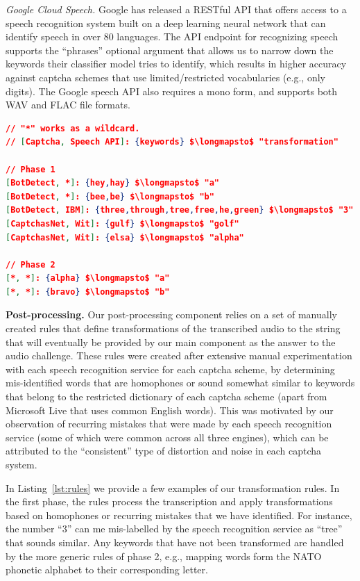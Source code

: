 \emph{Google Cloud Speech.}  Google has released a RESTful API that offers access to a speech recognition system built on 
a deep learning neural network that can identify speech in over 80 languages. The API endpoint for recognizing speech supports
the ``phrases'' optional argument that allows us to narrow down the keywords their classifier model tries to identify, which 
results in higher accuracy against captcha schemes that use limited/restricted vocabularies (e.g., only digits). The Google
speech API also requires a mono form, and supports both WAV and FLAC file formats.

\begin{lstlisting}[language=json,firstnumber=1,mathescape=true,caption={Subset of rules used by our post-processing component for
converting keywords in the transcription to the required transformation for the captcha's solution.},label={lst:rules}]
// "*" works as a wildcard. 
// [Captcha, Speech API]: {keywords} $\longmapsto$ "transformation"

// Phase 1
[BotDetect, *]: {hey,hay} $\longmapsto$ "a"
[BotDetect, *]: {bee,be} $\longmapsto$ "b"
[BotDetect, IBM]: {three,through,tree,free,he,green} $\longmapsto$ "3"
[CaptchasNet, Wit]: {gulf} $\longmapsto$ "golf"
[CaptchasNet, Wit]: {elsa} $\longmapsto$ "alpha"

// Phase 2
[*, *]: {alpha} $\longmapsto$ "a"
[*, *]: {bravo} $\longmapsto$ "b"
\end{lstlisting}

\textbf{Post-processing.} Our post-processing component relies on a set of manually created rules that define transformations
of the transcribed audio to the string that will eventually be provided by our main component as the answer to the audio challenge.
These rules were created after extensive manual experimentation with each speech recognition service for each captcha scheme,
by determining mis-identified words that are homophones or sound somewhat similar to keywords that belong to the 
restricted dictionary of each captcha scheme (apart from Microsoft Live that uses common English words). This was motivated
by our observation of recurring mistakes that were made by each speech recognition service (some of which were common across
all three engines), which can be attributed to the ``consistent'' type of distortion and noise in each captcha system.

In Listing~\ref{lst:rules} we provide a few examples of our transformation rules. In the first phase, the rules process the 
transcription and apply transformations based on homophones or recurring mistakes that we have identified. For instance, 
the number ``3'' can me mis-labelled by the speech recognition service as ``tree'' that sounds similar.
Any keywords that have not been transformed are handled by the more generic rules of phase 2, e.g., mapping 
words form the NATO phonetic alphabet to their corresponding letter.

